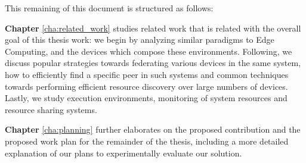 This remaining of this document is structured as follows:

\textbf{Chapter} \ref{cha:related_work} studies related work that is related with the overall goal of this thesis work: we begin by analyzing similar paradigms to Edge Computing, and the devices which compose these environments. Following, we discuss popular strategies towards federating various devices in the same system, how to efficiently find a specific peer in such systems and common techniques towards performing efficient resource discovery over large numbers of devices. Lastly, we study execution environments, monitoring of system resources and resource sharing systems. 

\textbf{Chapter} \ref{cha:planning} further elaborates on the proposed contribution and the proposed work plan for the remainder of the thesis, including a more detailed explanation of our plans to experimentally evaluate our solution.
